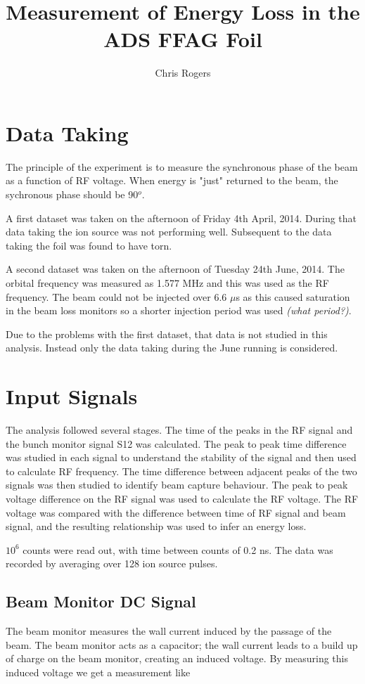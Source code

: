 \documentclass{paper}
\title{Measurement of Energy Loss in the ADS FFAG Foil}
\author{Chris Rogers }
\begin{document}
\maketitle

\section{Data Taking}
The principle of the experiment is to measure the synchronous phase of the beam
as a function of RF voltage. When energy is "just" returned to the beam, the
sychronous phase should be 90$^{o}$.

A first dataset was taken on the afternoon of Friday 4th April, 2014. During 
that data taking the ion source was not performing well. Subsequent to the data 
taking the foil was found to have torn.

A second dataset was taken on the afternoon of Tuesday 24th June, 2014. The
orbital frequency was measured as 1.577 MHz and this was used as the RF 
frequency. The beam could not be injected over 6.6 $\mu$s as this caused 
saturation in the beam loss monitors so a shorter injection period was used 
\emph{(what period?)}.

Due to the problems with the first dataset, that data is not studied in this
analysis. Instead only the data taking during the June running is considered.

\section{Input Signals}
The analysis followed several stages. The time of the peaks in the RF signal and 
the bunch monitor signal S12 was calculated. The peak to peak time difference
was studied in each signal to understand the stability of the signal and then 
used to calculate RF frequency. The time difference between adjacent peaks of 
the two signals was then studied to identify beam capture behaviour. The peak to
peak voltage difference on the RF signal was used to calculate the RF voltage. 
The RF voltage was compared with the difference between time of RF signal and
beam signal, and the resulting relationship was used to infer an energy loss.

$10^6$ counts were read out, with time between counts of 0.2 ns. The data 
was recorded by averaging over 128 ion source pulses.

\subsection{Beam Monitor DC Signal}
The beam monitor measures the wall current induced by the passage of the beam.
The beam monitor acts as a capacitor; the wall current leads to a build up of
charge on the beam monitor, creating an induced voltage. By measuring this 
induced voltage we get a measurement like 
\end{document}
